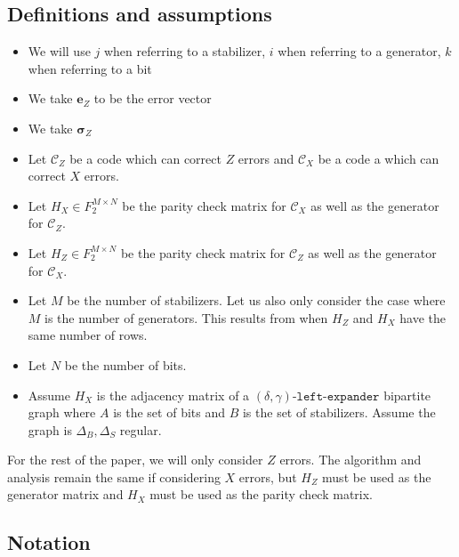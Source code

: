 \newcommand{\vecError}{{\boldsymbol{e}_Z}}
\newcommand{\vecSigma}{{\boldsymbol{\sigma}_Z}}
\newcommand{\matrixGenerator}{{H_X}}
\newcommand{\matrixParity}{H_Z}
\newcommand{\codeZ}{\mathcal{C}_Z}
\newcommand{\codeX}{\mathcal{C}_X}
\newcommand{\leftExpander}{(\delta, \gamma)\texttt{-left-expander}}
\newcommand{\NStablizer}{M}
\newcommand{\NBits}{N}
\newcommand{\MatrixField}{F_2^{\NStablizer \times \NBits}}
\newcommand{\DegBit}{\Delta_{B}}
\newcommand{\DegStab}{\Delta_{S}}

\subsection*{Definitions and assumptions}

\begin{itemize}
	\item We will use $j$ when referring to a stabilizer, $i$ when referring to a generator, $k$ when referring to a bit
	\item We take $\vecError$ to be the error vector
	\item We take $\vecSigma$
	\item Let $\codeZ$ be a code which can correct $Z$ errors and $\codeX$ be a code a which can correct $X$ errors.
	\item Let $H_X \in \MatrixField$ be the parity check matrix for $\codeX$ as well as the generator for $\codeZ$. 
	\item Let $H_Z \in \MatrixField$ be the parity check matrix for $\codeZ$ as well as the generator for $\codeX$.
	\item Let $\NStablizer$ be the number of stabilizers. Let us also only consider the case where $\NStablizer$ is the number of generators.
		This results from when $H_Z$ and $H_X$ have the same number of rows.
	\item Let $\NBits$ be the number of bits.
	\item Assume $\matrixGenerator$ is the adjacency matrix of a $\leftExpander$ bipartite graph where $A$ is the set of bits
		and $B$ is the set of stabilizers. Assume the graph is $\DegBit, \DegStab$ regular.
\end{itemize}

For the rest of the paper, we will only consider $Z$ errors. The algorithm and analysis remain the same 
if considering $X$ errors, but $H_Z$ must be used as the generator matrix and $H_X$ must be used as the parity check matrix.

\subsection*{Notation}
